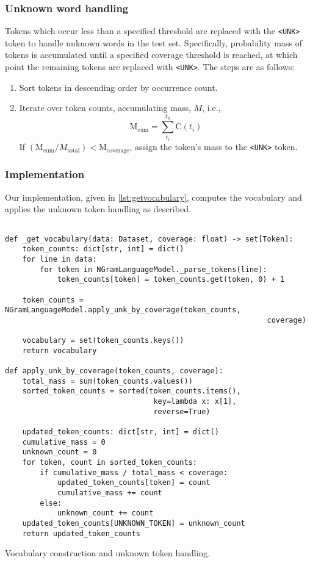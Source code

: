 \documentclass[a4paper]{article}
\begin{document}
\subsubsection{Unknown word handling}
Tokens which occur less than a specified threshold are replaced with the \texttt{<UNK>} token to handle unknown words in the test set. Specifically, probability mass of tokens is accumulated until a specified coverage threshold is reached, at which point the remaining tokens are replaced with \texttt{<UNK>}. The steps are as follows:

\begin{enumerate}
  \item Sort tokens in descending order by occurrence count.
  \item Iterate over token counts, accumulating mass, \(M\), i.e.,
        \[
          \text{M}_{\text{cum}} = \sum_{t_i}^{t_n}\text{C}(t_i)
        \]
        If \((\text{M}_{\text{cum}} / M_{\text{total}}) < \text{M}_{\text{coverage}}\), assign the token's mass to the \texttt{<UNK>} token.
\end{enumerate}

\subsubsection{Implementation}
Our implementation, given in \ref{lst:getvocabulary}, computes the vocabulary and applies the unknown token handling as described.

\begin{listing}[H]
  \begin{verbatim}
    
def _get_vocabulary(data: Dataset, coverage: float) -> set[Token]:
    token_counts: dict[str, int] = dict()
    for line in data:
        for token in NGramLanguageModel._parse_tokens(line):
            token_counts[token] = token_counts.get(token, 0) + 1
            
    token_counts = NGramLanguageModel.apply_unk_by_coverage(token_counts, 
                                                            coverage)
    
    vocabulary = set(token_counts.keys())
    return vocabulary

def apply_unk_by_coverage(token_counts, coverage):
    total_mass = sum(token_counts.values())
    sorted_token_counts = sorted(token_counts.items(), 
                                  key=lambda x: x[1], 
                                  reverse=True)

    updated_token_counts: dict[str, int] = dict()
    cumulative_mass = 0
    unknown_count = 0
    for token, count in sorted_token_counts:
        if cumulative_mass / total_mass < coverage:
            updated_token_counts[token] = count
            cumulative_mass += count
        else:
            unknown_count += count
    updated_token_counts[UNKNOWN_TOKEN] = unknown_count
    return updated_token_counts
\end{verbatim}
  \caption{Vocabulary construction and unknown token handling.}
  \label{lst:getvocabulary}
\end{listing}
\end{document}
